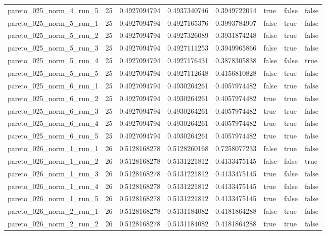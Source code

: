 \begin{tabular}{@{}llllllll@{}}
pareto\_025\_norm\_4\_run\_5 & 25 & 0.4927094794 & 0.4937340746 & 0.3949722014 & true & false & false \\
pareto\_025\_norm\_5\_run\_1 & 25 & 0.4927094794 & 0.4927165376 & 0.3993784907 & false & true & false \\
pareto\_025\_norm\_5\_run\_2 & 25 & 0.4927094794 & 0.4927326089 & 0.3931874248 & false & true & false \\
pareto\_025\_norm\_5\_run\_3 & 25 & 0.4927094794 & 0.4927111253 & 0.3949965866 & false & true & false \\
pareto\_025\_norm\_5\_run\_4 & 25 & 0.4927094794 & 0.4927176431 & 0.3878305838 & false & false & true \\
pareto\_025\_norm\_5\_run\_5 & 25 & 0.4927094794 & 0.4927112648 & 0.4156810828 & false & true & false \\
pareto\_025\_norm\_6\_run\_1 & 25 & 0.4927094794 & 0.4930264261 & 0.4057974482 & false & true & false \\
pareto\_025\_norm\_6\_run\_2 & 25 & 0.4927094794 & 0.4930264261 & 0.4057974482 & true & true & false \\
pareto\_025\_norm\_6\_run\_3 & 25 & 0.4927094794 & 0.4930264261 & 0.4057974482 & true & true & false \\
pareto\_025\_norm\_6\_run\_4 & 25 & 0.4927094794 & 0.4930264261 & 0.4057974482 & true & true & false \\
pareto\_025\_norm\_6\_run\_5 & 25 & 0.4927094794 & 0.4930264261 & 0.4057974482 & true & true & false \\
pareto\_026\_norm\_1\_run\_1 & 26 & 0.5128168278 & 0.5128260168 & 0.7258077233 & false & true & false \\
pareto\_026\_norm\_1\_run\_2 & 26 & 0.5128168278 & 0.5131221812 & 0.4133475145 & false & false & true \\
pareto\_026\_norm\_1\_run\_3 & 26 & 0.5128168278 & 0.5131221812 & 0.4133475145 & true & false & false \\
pareto\_026\_norm\_1\_run\_4 & 26 & 0.5128168278 & 0.5131221812 & 0.4133475145 & true & false & false \\
pareto\_026\_norm\_1\_run\_5 & 26 & 0.5128168278 & 0.5131221812 & 0.4133475145 & true & false & false \\
pareto\_026\_norm\_2\_run\_1 & 26 & 0.5128168278 & 0.5131184082 & 0.4181864288 & false & true & false \\
pareto\_026\_norm\_2\_run\_2 & 26 & 0.5128168278 & 0.5131184082 & 0.4181864288 & true & true & false \\

\end{tabular}

